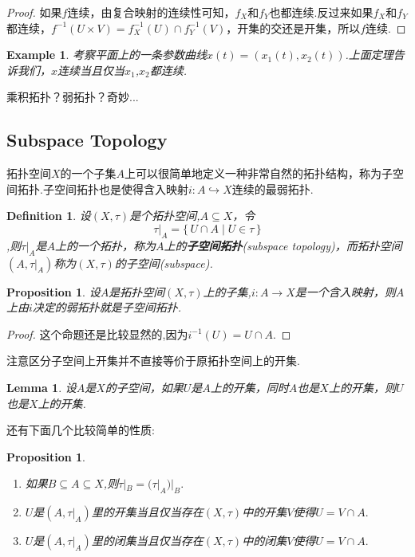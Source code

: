 \documentclass{article}
\newtheorem{lemma}[theorem]{Lemma}
\newtheorem{proposition}[theorem]{Proposition}
\newtheorem{example}[theorem]{Example}
\newtheorem{definition}[theorem]{Definition}
\newcommand*{\xfunc}[4]{{#2}\colon{#3}{#1}{#4}}
\newcommand*{\func}[3]{\xfunc{\to}{#1}{#2}{#3}}
\newcommand\Set[2]{\{\,#1\mid#2\,\}} %
\begin{document}
\begin{proof}
如果$f$连续，由复合映射的连续性可知，$f_X$和$f_Y$也都连续.反过来如果$f_X$和$f_Y$都连续，$f^{-1}(U \times V)=f_X^{-1}(U) \cap f_Y^{-1}(V)$，开集的交还是开集，所以$f$连续.
\end{proof}

\begin{example}
考察平面上的一条参数曲线$x(t)=(x_1(t),x_2(t))$.上面定理告诉我们，$x$连续当且仅当$x_1$,$x_2$都连续.
\end{example}

乘积拓扑？弱拓扑？奇妙...

\newpage
\subsection{Subspace Topology}

拓扑空间$X$的一个子集$A$上可以很简单地定义一种非常自然的拓扑结构，称为子空间拓扑.子空间拓扑也是使得含入映射$i \colon A \hookrightarrow X$连续的最弱拓扑.

\begin{definition}
设$(X,\tau)$是个拓扑空间,$A \subseteq X$，令\[\tau|_A=\Set{U \cap A}{U \in \tau}\],则$\tau|_A$是$A$上的一个拓扑，称为$A$上的\textbf{子空间拓扑}(subspace topology)，而拓扑空间$(A,\tau|_A)$称为$(X,\tau)$的子空间(subspace).
\end{definition}

\begin{proposition}
设$A$是拓扑空间$(X,\tau)$上的子集,$\func{i}{A}{X}$是一个含入映射，则$A$上由$i$决定的弱拓扑就是子空间拓扑.
\end{proposition}

\begin{proof}
这个命题还是比较显然的,因为$i^{-1}(U)=U \cap A$.
\end{proof}

注意区分子空间上开集并不直接等价于原拓扑空间上的开集.

\begin{lemma}
设$A$是$X$的子空间，如果$U$是$A$上的开集，同时$A$也是$X$上的开集，则$U$也是$X$上的开集.
\end{lemma}


还有下面几个比较简单的性质:

\begin{proposition}
\begin{enumerate}
	\item 如果$B \subseteq A \subseteq X$,则$\tau|_B = (\tau|_A)|_B.$
	\item $U$是$(A,\tau|_A)$里的开集当且仅当存在$(X,\tau)$中的开集$V$使得$U = V \cap A.$
	\item $U$是$(A,\tau|_A)$里的闭集当且仅当存在$(X,\tau)$中的闭集$V$使得$U = V \cap A.$
\end{enumerate}
\end{proposition}
\end{document}
